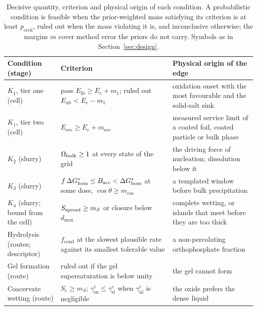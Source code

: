 \begin{table}[t]
\small
\caption{Decisive quantity, criterion and physical origin of each condition. A probabilistic condition is feasible when the prior-weighted mass satisfying its criterion is at least $p_\mathrm{cred}$, ruled out when the mass violating it is, and inconclusive otherwise; the margins $m$ cover method error the priors do not carry. Symbols as in Section~\ref{sec:design}.}
\label{tab:thresholds}
\begin{tabular*}{\textwidth}{@{}>{\raggedright\arraybackslash}p{}>{\raggedright\arraybackslash}p{}>{\raggedright\arraybackslash}p{}@{}}
\hline
Condition (stage) & Criterion & Physical origin of the edge\\
\hline
$K_1$, tier one (cell) & pass $E_\mathrm{lb}\ge E_\mathrm{c}+m_1$; ruled out $E_\mathrm{ub}<E_\mathrm{c}-m_1$ & oxidation onset with the most favourable and the solid-salt sink\\
$K_1$, tier two (cell) & $E_\mathrm{svc}\ge E_\mathrm{c}+m_\mathrm{svc}$ & measured service limit of a coated foil, coated particle or bulk phase\\
$K_2$ (slurry) & $\Omega_\mathrm{bulk}\ge1$ at every state of the grid & the driving force of nucleation; dissolution below it\\
$K_3$ (slurry) & $f\,\Delta G^{*}_\mathrm{hom}\le B_\mathrm{acc}<\Delta G^{*}_\mathrm{hom}$ at some dose, $\cos\theta\ge m_{\cos}$ & a templated window before bulk precipitation\\
$K_4$ (slurry; bound from the cell) & $S_\mathrm{spread}\ge m_S$ or closure below $d_\mathrm{max}$ & complete wetting, or islands that meet before they are too thick\\
Hydrolysis (routes; descriptor) & $f_\mathrm{cond}$ at the slowest plausible rate against its smallest tolerable value & a non-percolating orthophosphate fraction\\
Gel formation (route) & ruled out if the gel supersaturation is below unity & the gel cannot form\\
Coacervate wetting (route) & $S_\mathrm{c}\ge m_S$; $\gamma_\mathrm{sn}^\mathrm{c}\le\gamma_\mathrm{sl}^\mathrm{c}$ when $\gamma_\mathrm{nl}^\mathrm{c}$ is negligible & the oxide prefers the dense liquid\\
\hline
\end{tabular*}
\end{table}

